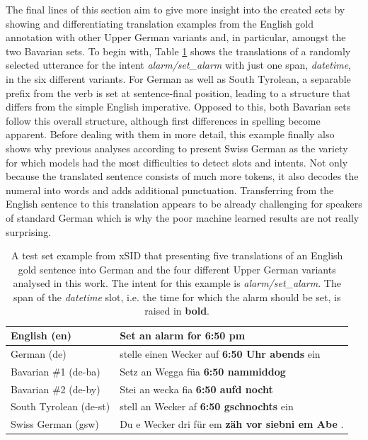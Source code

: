 \documentclass[11pt,a4paper,twoside,openright]{scrbook}
\begin{document}
The final lines of this section aim to give more insight into the created sets by showing and differentiating translation examples from the English gold annotation with other Upper German variants and, in particular, amongst the two Bavarian sets. To begin with, Table \ref{tab:dialects_example_1} shows the translations of a randomly selected utterance for the intent \textit{alarm/set\_alarm} with just one span, \textit{datetime}, in the six different variants. For German as well as South Tyrolean, a separable prefix from the verb is set at sentence-final position, leading to a structure that differs from the simple English imperative. Opposed to this, both Bavarian sets follow this overall structure, although first differences in spelling become apparent. Before dealing with them in more detail, this example finally also shows why previous analyses according to \citet{2023-findings-vardial} present Swiss German as the variety for which models had the most difficulties to detect slots and intents. Not only because the translated sentence consists of much more tokens, it also decodes the numeral into words and adds additional punctuation. Transferring from the English sentence to this translation appears to be already challenging for speakers of standard German which is why the poor machine learned results are not really surprising.

\begin{table}[!ht]
\centering
\begin{tabular}{l|l}
English (en)           & Set an alarm for \textbf{6:50 pm}                       \\
\hline
German (de)            & stelle einen Wecker auf \textbf{6:50 Uhr abends} ein    \\
Bavarian \#1 (de-ba)   & Setz an Wegga füa \textbf{6:50 nammiddog}               \\
Bavarian \#2 (de-by)   & Stei an wecka fia \textbf{6:50 aufd nocht}              \\
South Tyrolean (de-st) & stell an Wecker af \textbf{6:50 gschnochts} ein         \\
Swiss German (gsw)     & Du e Wecker dri für em \textbf{zäh vor siebni em Abe} .
\end{tabular}
\caption{A test set example from xSID that presenting five translations of an English gold sentence into German and the four different Upper German variants analysed in this work. The intent for this example is \textit{alarm/set\_alarm}. The span of the \textit{datetime} slot, i.e. the time for which the alarm should be set, is raised in \textbf{bold}.}
\label{tab:dialects_example_1}
\end{table}
\end{document}
